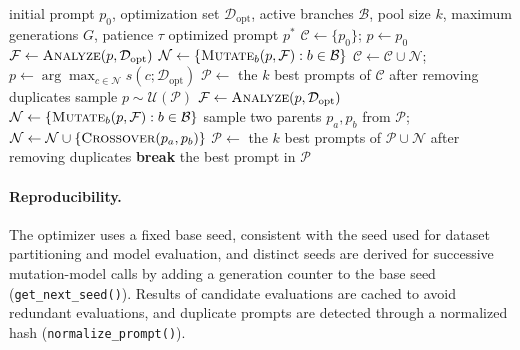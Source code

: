 \documentclass[pdflatex,sn-mathphys-num]{sn-jnl}%
\theoremstyle{thmstyleone}%
\theoremstyle{thmstyletwo}%
\theoremstyle{thmstylethree}%
\begin{document}
 
\begin{algorithm}[htbp]
      \caption{Multi-branch top-\(k\) prompt optimization}\label{alg:optimizer}
      \begin{algorithmic}[1]
      \Require initial prompt \(p_0\), optimization set \(\mathcal{D}_{\text{opt}}\), active branches \(\mathcal{B}\), pool size \(k\), maximum generations \(G\), patience \(\tau\)
      \Ensure optimized prompt \(p^{\ast}\)
      \State \(\mathcal{C}\gets\{p_0\}\); \(p\gets p_0\) 
        \State \(\mathcal{F}\gets\textsc{Analyze}(p,\mathcal{D}_{\text{opt}})\) 
        \State \(\mathcal{N}\gets\{\textsc{Mutate}_b(p,\mathcal{F}) : b\in\mathcal{B}\}\)
        \State \(\mathcal{C}\gets\mathcal{C}\cup\mathcal{N}\); \(p\gets\arg\max_{c\in\mathcal{N}} s(c;\mathcal{D}_{\text{opt}})\)
      \EndWhile
      \State \(\mathcal{P}\gets\) the \(k\) best prompts of \(\mathcal{C}\) after removing duplicates
        \State sample \(p\sim\mathcal{U}(\mathcal{P})\)
        \State \(\mathcal{F}\gets\textsc{Analyze}(p,\mathcal{D}_{\text{opt}})\) 
        \State \(\mathcal{N}\gets\{\textsc{Mutate}_b(p,\mathcal{F}) : b\in\mathcal{B}\}\)
          \State sample two parents \(p_a,p_b\) from \(\mathcal{P}\); \(\mathcal{N}\gets\mathcal{N}\cup\{\textsc{Crossover}(p_a,p_b)\}\)
        \EndIf
        \State \(\mathcal{P}\gets\) the \(k\) best prompts of \(\mathcal{P}\cup\mathcal{N}\) after removing duplicates
          \State \textbf{break} 
        \EndIf
      \EndFor
      \State \Return the best prompt in \(\mathcal{P}\)
      \end{algorithmic}
\end{algorithm}

\paragraph{Reproducibility.}

The optimizer uses a fixed base seed, consistent with the seed used for 
dataset partitioning and model evaluation, and distinct seeds are derived 
for successive mutation-model calls by adding a generation counter to the 
base seed (\texttt{get\_next\_seed()}). Results of candidate evaluations are 
cached to avoid redundant evaluations, and duplicate prompts are detected 
through a normalized hash (\texttt{normalize\_prompt()}).
\end{document}

